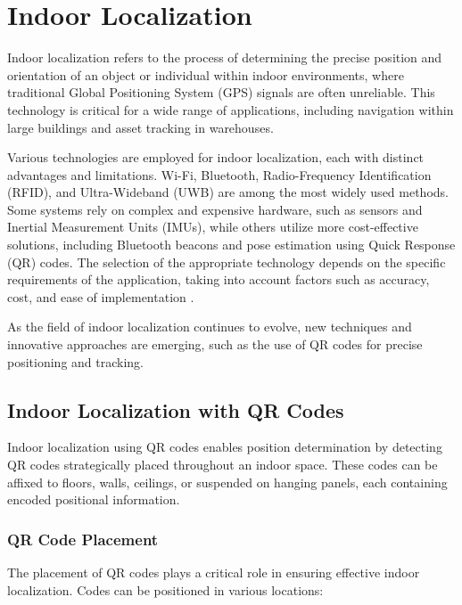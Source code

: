 \section{Indoor Localization}

Indoor localization refers to the process of determining the precise position and orientation of an object or individual within indoor environments, where traditional Global Positioning System (GPS) signals are often unreliable. This technology is critical for a wide range of applications, including navigation within large buildings and asset tracking in warehouses.

Various technologies are employed for indoor localization, each with distinct advantages and limitations. Wi-Fi, Bluetooth, Radio-Frequency Identification (RFID), and Ultra-Wideband (UWB) are among the most widely used methods. Some systems rely on complex and expensive hardware, such as sensors and Inertial Measurement Units (IMUs), while others utilize more cost-effective solutions, including Bluetooth beacons and pose estimation using Quick Response (QR) codes. The selection of the appropriate technology depends on the specific requirements of the application, taking into account factors such as accuracy, cost, and ease of implementation \cite{leitch2023}.

As the field of indoor localization continues to evolve, new techniques and innovative approaches are emerging, such as the use of QR codes for precise positioning and tracking.

\subsection{Indoor Localization with QR Codes}

Indoor localization using QR codes enables position determination by detecting QR codes strategically placed throughout an indoor space. These codes can be affixed to floors, walls, ceilings, or suspended on hanging panels, each containing encoded positional information.

\subsubsection{QR Code Placement}

The placement of QR codes plays a critical role in ensuring effective indoor localization. Codes can be positioned in various locations:


